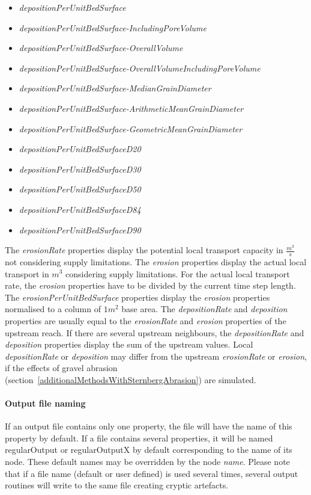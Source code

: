 \documentclass[11pt,a4paper]{article}
\begin{document}
\vspace{3ex}
\begin{multicols}{2}
\begin{itemize}
	\item \emph{depositionPerUnitBedSurface}
	\item \emph{depositionPerUnitBedSurface-}\emph{IncludingPoreVolume}
	\item \emph{depositionPerUnitBedSurface-}\emph{OverallVolume}
	\item \emph{depositionPerUnitBedSurface-}\emph{OverallVolumeIncludingPoreVolume}
	\item \emph{depositionPerUnitBedSurface-}\emph{MedianGrainDiameter}
	\item \emph{depositionPerUnitBedSurface-}\emph{ArithmeticMeanGrainDiameter}
	\item \emph{depositionPerUnitBedSurface-}\emph{GeometricMeanGrainDiameter}
	\item \emph{depositionPerUnitBedSurfaceD20}
	\item \emph{depositionPerUnitBedSurfaceD30}
	\item \emph{depositionPerUnitBedSurfaceD50}
	\item \emph{depositionPerUnitBedSurfaceD84}
	\item \emph{depositionPerUnitBedSurfaceD90}
\end{itemize}
\end{multicols}

The \emph{erosionRate} properties display the potential local transport capacity in $\frac{m^3}{s}$ not considering supply limitations. The \emph{erosion} properties display the actual local transport in $m^3$ considering supply limitations. For the actual local transport rate, the \emph{erosion} properties have to be divided by the current time step length. The \emph{erosionPerUnitBedSurface} properties display the \emph{erosion} properties normalised to a column of $1 m^2$ base area. The \emph{depositionRate} and \emph{deposition} properties are usually equal to the \emph{erosionRate} and \emph{erosion} properties of the upstream reach. If there are several upstream neighbours, the \emph{depositionRate} and \emph{deposition} properties display the sum of the upstream values. Local \emph{depositionRate} or \emph{deposition} may differ from the upstream  \emph{erosionRate} or \emph{erosion}, if the effects of gravel abrasion (section~\ref{additionalMethodsWithSternbergAbrasion}) are simulated.

\paragraph{Output file naming}
If an output file contains only one property, the file will have the name of this property by default. If a file contains several properties, it will be named regularOutput or regularOutputX by default corresponding to the name of its node. These default names may be overridden by the node \emph{name}. Please note that if a file name (default or user defined) is used several times, several output routines will write to the same file creating cryptic artefacts.
\end{document}
